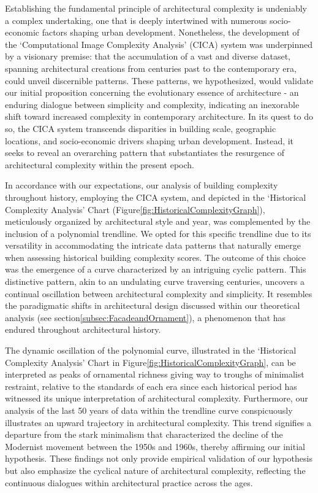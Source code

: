 Establishing the fundamental principle of architectural complexity is undeniably a complex undertaking, one that is deeply intertwined with numerous socio-economic factors shaping urban development.
Nonetheless, the development of the `Computational Image Complexity Analysis' (CICA) system was underpinned by a visionary premise: that the accumulation of a vast and diverse dataset, spanning architectural creations from centuries past to the contemporary era, could unveil discernible patterns.
These patterns, we hypothesized, would validate our initial proposition concerning the evolutionary essence of architecture - an enduring dialogue between simplicity and complexity, indicating an inexorable shift toward increased complexity in contemporary architecture.
In its quest to do so, the CICA system transcends disparities in building scale, geographic locations, and socio-economic drivers shaping urban development.
Instead, it seeks to reveal an overarching pattern that substantiates the resurgence of architectural complexity within the present epoch.

In accordance with our expectations, our analysis of building complexity throughout history, employing the CICA system, and depicted in the `Historical Complexity Analysis' Chart (Figure\ref{fig:HistoricalComplexityGraph}), meticulously organized by architectural style and year, was complemented by the inclusion of a polynomial trendline.
We opted for this specific trendline due to its versatility in accommodating the intricate data patterns that naturally emerge when assessing historical building complexity scores.
The outcome of this choice was the emergence of a curve characterized by an intriguing cyclic pattern.
This distinctive pattern, akin to an undulating curve traversing centuries, uncovers a continual oscillation between architectural complexity and simplicity.
It resembles the paradigmatic shifts in architectural design discussed within our theoretical analysis (see section\ref{subsec:FacadeandOrnament}), a phenomenon that has endured throughout architectural history.

The dynamic oscillation of the polynomial curve, illustrated in the `Historical Complexity Analysis' Chart in Figure\ref{fig:HistoricalComplexityGraph}, can be interpreted as peaks of ornamental richness giving way to troughs of minimalist restraint, relative to the standards of each era since each historical period has witnessed its unique interpretation of architectural complexity.
Furthermore, our analysis of the last 50 years of data within the trendline curve conspicuously illustrates an upward trajectory in architectural complexity.
This trend signifies a departure from the stark minimalism that characterized the decline of the Modernist movement between the 1950s and 1960s, thereby affirming our initial hypothesis.
These findings not only provide empirical validation of our hypothesis but also emphasize the cyclical nature of architectural complexity, reflecting the continuous dialogues within architectural practice across the ages.

